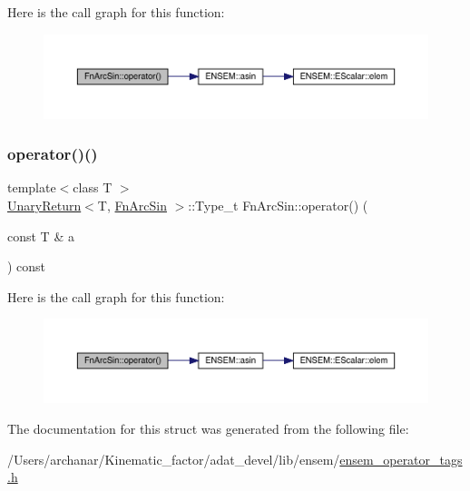 Here is the call graph for this function\+:
\nopagebreak
\begin{figure}[H]
\begin{center}
\leavevmode
\includegraphics[width=350pt]{d3/d85/structFnArcSin_a12cc5b8e1ae14e2bdb4a9ec3be431874_cgraph}
\end{center}
\end{figure}
\mbox{\label{structFnArcSin_a12cc5b8e1ae14e2bdb4a9ec3be431874}} 
\subsubsection{\texorpdfstring{operator()()}{operator()()}\hspace{0.1cm}{\footnotesize\ttfamily [2/2]}}
{\footnotesize\ttfamily template$<$class T $>$ \\
\mbox{\hyperlink{structUnaryReturn}{Unary\+Return}}$<$T, \mbox{\hyperlink{structFnArcSin}{Fn\+Arc\+Sin}} $>$\+::Type\+\_\+t Fn\+Arc\+Sin\+::operator() (\begin{DoxyParamCaption}\item[{const T \&}]{a }\end{DoxyParamCaption}) const\hspace{0.3cm}{\ttfamily [inline]}}

Here is the call graph for this function\+:
\nopagebreak
\begin{figure}[H]
\begin{center}
\leavevmode
\includegraphics[width=350pt]{d3/d85/structFnArcSin_a12cc5b8e1ae14e2bdb4a9ec3be431874_cgraph}
\end{center}
\end{figure}


The documentation for this struct was generated from the following file\+:\begin{DoxyCompactItemize}
\item 
/\+Users/archanar/\+Kinematic\+\_\+factor/adat\+\_\+devel/lib/ensem/\mbox{\hyperlink{lib_2ensem_2ensem__operator__tags_8h}{ensem\+\_\+operator\+\_\+tags.\+h}}\end{DoxyCompactItemize}
